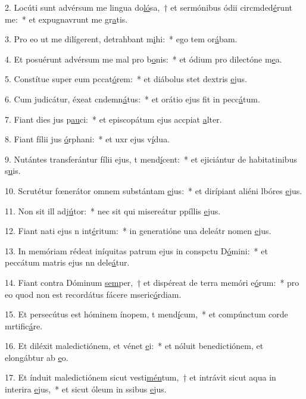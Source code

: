 2. Locúti sunt advérsum me lingua do\uline{ló}sa,~† et sermónibus ódii circmded\uline{é}runt me:~* et expugnavrunt me gr\uline{a}tis.\par 
3. Pro eo ut me dilígerent, detrahbant m\uline{i}hi:~* ego tem or\uline{á}bam.\par 
4. Et posuérunt advérsum me mal pro b\uline{o}nis:~* et ódium pro dilectóne m\uline{e}a.\par 
5. Constítue super eum pccat\uline{ó}rem:~* et diábolus stet  dextris \uline{e}jus.\par 
6. Cum judicátur, éxeat cndemn\uline{á}tus:~* et orátio ejus fit in pecc\uline{á}tum.\par 
7. Fiant dies jus p\uline{au}ci:~* et episcopátum ejus accpiat \uline{a}lter.\par 
8. Fiant fílii jus \uline{ó}rphani:~* et uxr ejus v\uline{í}dua.\par 
9. Nutántes transferántur fílii ejus, t mend\uline{í}cent:~* et ejiciántur de habitatinibus s\uline{u}is.\par 
10. Scrutétur fœnerátor omnem substántam \uline{e}jus:~* et dirípiant aliéni lbóres \uline{e}jus.\par 
11. Non sit ill adj\uline{ú}tor:~* nec sit qui misereátur ppíllis \uline{e}jus.\par 
12. Fiant nati ejus n int\uline{é}ritum:~* in generatióne una deleátr nomen \uline{e}jus.\par 
13. In memóriam rédeat iníquitas patrum ejus in conspctu D\uline{ó}mini:~* et peccátum matris ejus nn dele\uline{á}tur.\par 
14. Fiant contra Dóminum \uline{sem}per,~† et dispéreat de terra memóri e\uline{ó}rum:~* pro eo quod non est recordátus fácere mseric\uline{ó}rdiam.\par 
15. Et persecútus est hóminem ínopem, t mend\uline{í}cum,~* et compúnctum corde mrtific\uline{á}re.\par 
16. Et diléxit maledictiónem, et vénet \uline{e}i:~* et nóluit benedictiónem, et elongábtur ab \uline{e}o.\par 
17. Et índuit maledictiónem sicut vesti\uline{mén}tum,~† et intrávit sicut aqua in interira \uline{e}jus,~* et sicut óleum in ssibus \uline{e}jus.\par 
